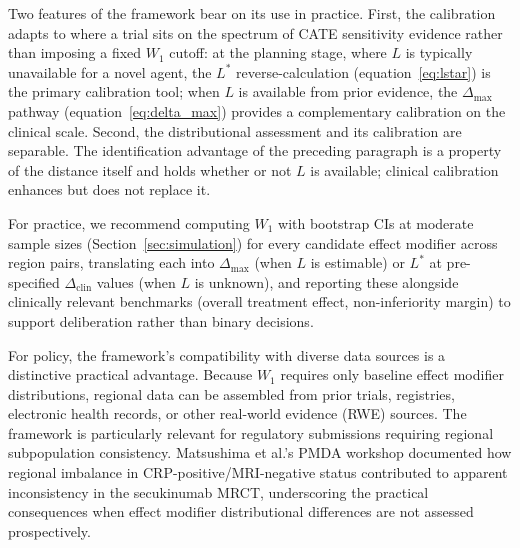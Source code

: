 \documentclass[AMA,Times1COL]{WileyNJDv5}
\begin{document}
Two features of the framework bear on its use in practice. First, the calibration adapts to where a trial sits on the spectrum of CATE sensitivity evidence rather than imposing a fixed $W_1$ cutoff: at the planning stage, where $L$ is typically unavailable for a novel agent, the $L^*$ reverse-calculation (equation~\ref{eq:lstar}) is the primary calibration tool; when $L$ is available from prior evidence, the $\Delta_{\max}$ pathway (equation~\ref{eq:delta_max}) provides a complementary calibration on the clinical scale. Second, the distributional assessment and its calibration are separable. The identification advantage of the preceding paragraph is a property of the distance itself and holds whether or not $L$ is available; clinical calibration enhances but does not replace it.

For practice, we recommend computing $W_1$ with bootstrap CIs at moderate sample sizes (Section~\ref{sec:simulation}) for every candidate effect modifier across region pairs, translating each into $\Delta_{\max}$ (when $L$ is estimable) or $L^*$ at pre-specified $\Delta_{\text{clin}}$ values (when $L$ is unknown), and reporting these alongside clinically relevant benchmarks (overall treatment effect, non-inferiority margin) to support deliberation rather than binary decisions.

For policy, the framework's compatibility with diverse data sources is a distinctive practical advantage. Because $W_1$ requires only baseline effect modifier distributions, regional data can be assembled from prior trials, registries, electronic health records, or other real-world evidence (RWE) sources. The framework is particularly relevant for regulatory submissions requiring regional subpopulation consistency.\cite{matsushima2024,song2025} Matsushima et al.'s\cite{matsushima2024} PMDA workshop documented how regional imbalance in CRP-positive/MRI-negative status contributed to apparent inconsistency in the secukinumab MRCT, underscoring the practical consequences when effect modifier distributional differences are not assessed prospectively.
\end{document}
